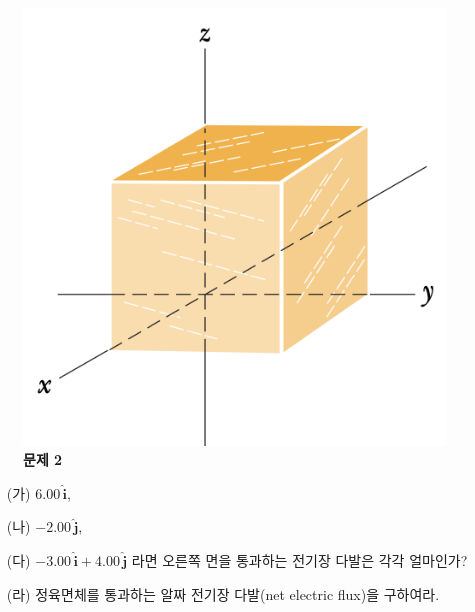 \documentclass[tightenlines,floatfix,nofootinbib,superscriptaddress,fleqn]{revtex4-2}
\begin{document}
\begin{figure}[htp]
  \centering
  \includegraphics[scale=0.6]{qfig3-1.png}
  \caption{\textbf{문제 2}}
  \label{fig:1}
\end{figure}
\begin{itemize}
\item[(가)] $6.00\,\hat{\bm{i}}$,
\item[(나)] $-2.00\,\hat{\bm{j}}$,
\item[(다)] $-3.00\,\hat{\bm{i}}+4.00\,\hat{\bm{j}}$  
  라면 오른쪽 면을 통과하는 전기장 다발은 각각 얼마인가?
\item[(라)] 정육면체를 통과하는 알짜 전기장 다발(net electric flux)을
  구하여라.   
\end{itemize}
\vspace{0.5cm}
\end{document}
